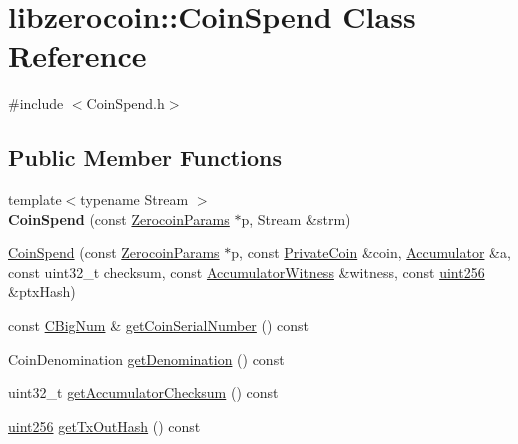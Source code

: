 \hypertarget{classlibzerocoin_1_1_coin_spend}{}\section{libzerocoin\+::Coin\+Spend Class Reference}
\label{classlibzerocoin_1_1_coin_spend}


{\ttfamily \#include $<$Coin\+Spend.\+h$>$}

\subsection*{Public Member Functions}
\begin{DoxyCompactItemize}
\item 
\mbox{\label{classlibzerocoin_1_1_coin_spend_af4adb9a70e147e566ce7a54b1747e517}} 
{\footnotesize template$<$typename Stream $>$ }\\{\bfseries Coin\+Spend} (const \mbox{\hyperlink{classlibzerocoin_1_1_zerocoin_params}{Zerocoin\+Params}} $\ast$p, Stream \&strm)
\item 
\mbox{\hyperlink{classlibzerocoin_1_1_coin_spend_ab26a001c08285be91ca2bf1d310d3cd6}{Coin\+Spend}} (const \mbox{\hyperlink{classlibzerocoin_1_1_zerocoin_params}{Zerocoin\+Params}} $\ast$p, const \mbox{\hyperlink{classlibzerocoin_1_1_private_coin}{Private\+Coin}} \&coin, \mbox{\hyperlink{classlibzerocoin_1_1_accumulator}{Accumulator}} \&a, const uint32\+\_\+t checksum, const \mbox{\hyperlink{classlibzerocoin_1_1_accumulator_witness}{Accumulator\+Witness}} \&witness, const \mbox{\hyperlink{classuint256}{uint256}} \&ptx\+Hash)
\item 
const \mbox{\hyperlink{class_c_big_num}{C\+Big\+Num}} \& \mbox{\hyperlink{classlibzerocoin_1_1_coin_spend_a125e5f3e268571a5549aa10bf9ad0f2b}{get\+Coin\+Serial\+Number}} () const
\item 
Coin\+Denomination \mbox{\hyperlink{classlibzerocoin_1_1_coin_spend_a1e36726a516e8b0a110fa40afbcc76bc}{get\+Denomination}} () const
\item 
uint32\+\_\+t \mbox{\hyperlink{classlibzerocoin_1_1_coin_spend_af28d898602cc07bd02f77fd8bc641600}{get\+Accumulator\+Checksum}} () const
\item 
\mbox{\hyperlink{classuint256}{uint256}} \mbox{\hyperlink{classlibzerocoin_1_1_coin_spend_a58d9ad8806aac3e37ff1110d95a12bbb}{get\+Tx\+Out\+Hash}} () const
\item 
\mbox{\label{classlibzerocoin_1_1_coin_spend_a993416fb14e9c64efd30250d660aa6e0}} 

\end{DoxyCompactItemize}
